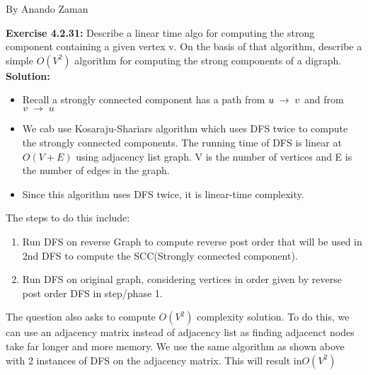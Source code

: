 \documentclass[11pt,fleqn]{article}
\newcommand{\be}{\begin{enumerate}}
\newcommand{\ee}{\end{enumerate}}
\begin{document}
By Anando Zaman


\textbf{Exercise 4.2.31:} Describe a linear time algo for computing the strong component containing a given vertex v. On the basis of that algorithm, describe a simple $O(V^2)$ algorithm for computing the strong components of a digraph.\\

\textbf{Solution:}
\begin{itemize}
	\item Recall a strongly connected component has a path from $u \thickspace \rightarrow \thickspace v$ and from $v \thickspace \rightarrow \thickspace u$
	
	\item We cab use Kosaraju-Shariars algorithm which uses DFS twice to compute the strongly connected components. The running time of DFS is linear at $O(V + E)$ using adjacency list graph. V is the number of vertices and E is the number of edges in the graph.
	
	\item Since this algorithm uses DFS twice, it is linear-time complexity.
\end{itemize}

The steps to do this include:\\
\be
	\item Run DFS on reverse Graph to compute reverse post order that will be used in 2nd DFS to compute the SCC(Strongly connected component).
	\item Run DFS on original graph, considering vertices in order given by reverse post order DFS in step/phase 1.
\ee

The question also asks to compute $O(V^2)$ complexity solution. To do this, we can use an adjacency matrix instead of adjacency list as finding adjacenct nodes take far longer and more memory. We use the same algorithm as shown above with 2 instances of DFS on the adjacency matrix. This will result in$O(V^2)$\\
\end{document}
